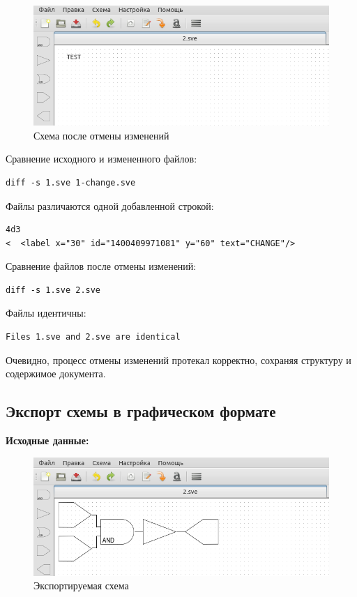 \begin{figure}[H]
  \centering
  \includegraphics[width=1\textwidth]{gui/test/history-2.png}
  \caption{Схема после отмены изменений}
  \label{fig:test-hist-2}
\end{figure}

Сравнение исходного и измененного файлов:
\begin{lstlisting}
diff -s 1.sve 1-change.sve
\end{lstlisting}

Файлы различаются одной добавленной строкой:
\begin{lstlisting}
4d3
<  <label x="30" id="1400409971081" y="60" text="CHANGE"/>
\end{lstlisting}

Сравнение файлов после отмены изменений:
\begin{lstlisting}
diff -s 1.sve 2.sve
\end{lstlisting}

Файлы идентичны:
\begin{lstlisting}
Files 1.sve and 2.sve are identical
\end{lstlisting}

Очевидно, процесс отмены изменений протекал корректно, сохраняя структуру и содержимое документа.

\subsection{Экспорт схемы в графическом формате}
\textbf{Исходные данные:}
\begin{figure}[H]
  \centering
  \includegraphics[width=1\textwidth]{gui/test/export-1.png}
  \caption{Экспортируемая схема}
  \label{fig:test-export-1}
\end{figure}

